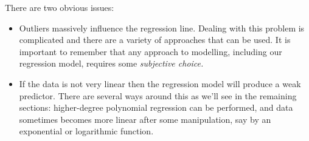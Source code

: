 
There are two obvious issues:
\begin{itemize}
  \item Outliers massively influence the regression line. Dealing with this problem is complicated and there are a variety of approaches that can be used. It is important to remember that any approach to modelling, including our regression model, requires some \emph{subjective choice.}
  \item If the data is not very linear then the regression model will produce a weak predictor. There are several ways around this as we'll see in the remaining sections: higher-degree polynomial regression can be performed, and data sometimes becomes more linear after some manipulation, say by an exponential or logarithmic function.
\end{itemize}



